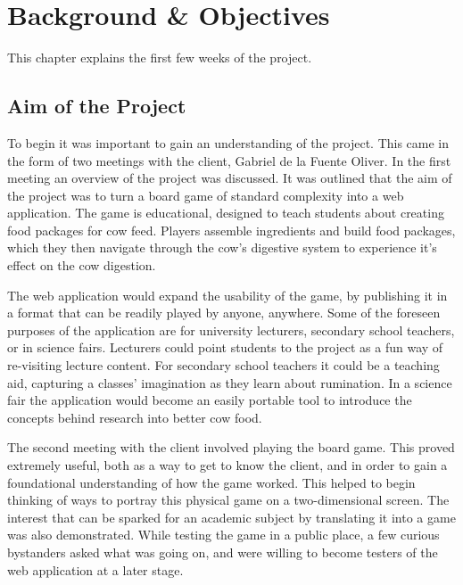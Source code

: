 \chapter{Background \& Objectives}
This chapter explains the first few weeks of the project.

\section{Aim of the Project}
To begin it was important to gain an understanding of the project. This came in the form of two meetings with the client, Gabriel de la Fuente Oliver. In the first meeting an overview of the project was discussed. It was outlined that the aim of the project was to turn a board game of standard complexity into a web application. The game is educational, designed to teach students about creating food packages for cow feed. Players assemble ingredients and build food packages, which they then navigate through the cow's digestive system to experience it's effect on the cow digestion. 
	
The web application would expand the usability of the game, by publishing it in a format that can be readily played by anyone, anywhere. Some of the foreseen purposes of the application are for university lecturers, secondary school teachers, or in science fairs. Lecturers could point students to the project as a fun way of re-visiting lecture content. For secondary school teachers it could be a teaching aid, capturing a classes' imagination as they learn about rumination. In a science fair the application would become an easily portable tool to introduce the concepts behind research into better cow food.
	
The second meeting with the client involved playing the board game. This proved extremely useful, both as a way to get to know the client, and in order to gain a foundational understanding of how the game worked. This helped to begin thinking of ways to portray this physical game on a two-dimensional screen. The interest that can be sparked for an academic subject by translating it into a game was also demonstrated. While testing the game in a public place, a few curious bystanders asked what was going on, and were willing to become testers of the web application at a later stage.
	

